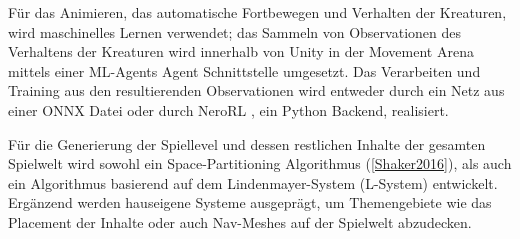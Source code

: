 Für das Animieren, das automatische Fortbewegen und Verhalten der Kreaturen, wird maschinelles Lernen verwendet; das Sammeln von Observationen des Verhaltens der Kreaturen wird innerhalb von Unity in der Movement Arena mittels einer ML-Agents Agent \cite{mlAgents} Schnittstelle umgesetzt. Das Verarbeiten und Training aus den resultierenden Observationen wird entweder durch ein Netz aus einer ONNX Datei oder durch NeroRL \cite{neroRL}, ein Python Backend, realisiert.

Für die Generierung der Spiellevel und dessen restlichen Inhalte der gesamten Spielwelt wird sowohl ein Space-Partitioning Algorithmus (\ref{Shaker2016}), als auch ein Algorithmus basierend auf dem Lindenmayer-System (L-System) \cite{lindenmayer1990} entwickelt. Ergänzend werden hauseigene Systeme ausgeprägt, um Themengebiete wie das Placement der Inhalte oder auch Nav-Meshes auf der Spielwelt abzudecken.

